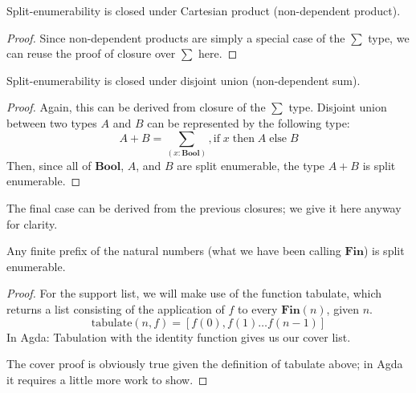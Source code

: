 \begin{lemma}
  Split-enumerability is closed under Cartesian product (non-dependent product).
\end{lemma} 
\begin{proof}
  Since non-dependent products are simply a special case of the \(\sum\) type,
  we can reuse the proof of closure over \(\sum\) here.
\end{proof}
\begin{lemma}
  Split-enumerability is closed under disjoint union (non-dependent sum).
\end{lemma}
\begin{proof}
  Again, this can be derived from closure of the \(\sum\) type.
  Disjoint union between two types \(A\) and \(B\) can be represented by the
  following type:
  \begin{equation}
    A + B = \sum_{(x : \mathbf{Bool})} , \text{if} \; x \; \text{then} \; A \; \text{else} \; B
  \end{equation}
  Then, since all of \(\mathbf{Bool}\), \(A\), and \(B\) are split enumerable,
  the type \(A + B\) is split enumerable.
\end{proof}
The final case can be derived from the previous closures; we give it here anyway
for clarity.
\begin{lemma} \label{fin-split-enum}
  Any finite prefix of the natural numbers (what we have been calling
  \(\textbf{Fin}\)) is split enumerable.
\end{lemma}
\begin{proof}
  For the support list, we will make use of the function tabulate, which returns
  a list consisting of the application of \(f\) to every \(\textbf{Fin}(n)\),
  given \(n\).
  \begin{equation}
    \text{tabulate}(n , f) = \left[ f(0) , f(1) \dots f(n - 1) \right]
  \end{equation}
  In Agda:
  Tabulation with the identity function gives us our cover list.

  The cover proof is obviously true given the definition of tabulate above; in
  Agda it requires a little more work to show.
\end{proof}
